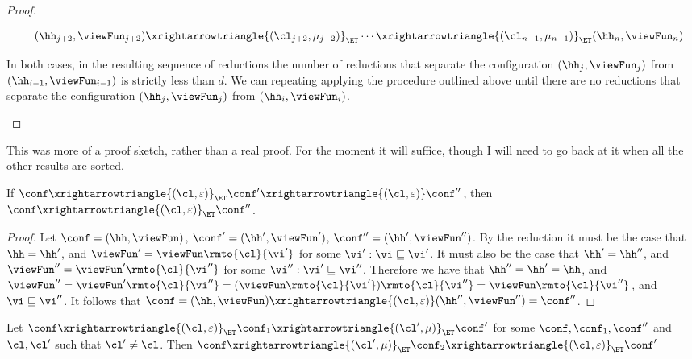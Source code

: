 \begin{proof}
\begin{enumerate}
\begin{itemize}
\[\begin{array}{@{}l@{}}
\quad (\hh_{j+2}, \viewFun_{j+2}) \xrightarrowtriangle{(\cl_{j+2}, \mu_{j+2})}_{\ET} \cdots 
\xrightarrowtriangle{(\cl_{n-1}, \mu_{n-1})}_{\ET} (\hh_{n}, \viewFun_{n})
\end{array}
\]
\end{itemize}
In both cases, in the resulting sequence of reductions the number of reductions that separate 
the configuration $(\hh_{j}, \viewFun_{j})$ from $(\hh_{i-1}, \viewFun_{i-1})$ is strictly 
less than $d$. We can repeating applying the procedure outlined above until there are 
no reductions that separate the configuration $(\hh_{j}, \viewFun_{j})$ from 
$(\hh_{i}, \viewFun_{i})$.
\end{enumerate}
\end{proof}
\ac{This was more of a proof sketch, rather than a real proof. For the moment it will suffice, though 
I will need to go back at it when all the other results are sorted.}


\begin{lemma}[Absorption]
\label{lem:et.absorb}
If $\conf \xrightarrowtriangle{(\cl, \varepsilon)}_{\ET} \conf' \xrightarrowtriangle{(\cl, \varepsilon)} \conf''$, then 
$\conf \xrightarrowtriangle{(\cl, \varepsilon)}_{\ET} \conf''$.
\end{lemma}

\begin{proof}
Let $\conf = (\hh, \viewFun)$, $\conf' = (\hh', \viewFun')$, $\conf'' = (\hh', \viewFun'')$. 
By the reduction it must be the case that $\hh = \hh'$, and $\viewFun' = \viewFun\rmto{\cl}{\vi'}$ 
for some $\vi' : \vi \sqsubseteq \vi'$. It must also be the case that $\hh' = \hh''$, and $\viewFun'' = \viewFun'\rmto{\cl}{\vi''}$ 
for some $\vi'': \vi' \sqsubseteq \vi''$. Therefore we have that $\hh'' = \hh' = \hh$, and 
$\viewFun'' = \viewFun'\rmto{\cl}{\vi''} = (\viewFun\rmto{\cl}{\vi'})\rmto{\cl}{\vi''} = \viewFun\rmto{\cl}{\vi''}$, 
and $\vi \sqsubseteq \vi''$. 
It follows that $\conf = (\hh, \viewFun) \xrightarrowtriangle{(\cl, \varepsilon)} (\hh'', \viewFun'') = \conf''$.
\end{proof}

\begin{lemma}
\label{lem:viewshift.rightmover}
Let $\conf \xrightarrowtriangle{(\cl, \varepsilon)}_{\ET} \conf_1 \xrightarrowtriangle{(\cl', \mu)}_{\ET} \conf'$ 
for some $\conf, \conf_1, \conf''$ and $\cl, \cl'$ such that $\cl' \neq \cl$. 
Then $\conf \xrightarrowtriangle{(\cl', \mu)}_{\ET} \conf_2 \xrightarrowtriangle{(\cl, \varepsilon)}_{\ET} \conf'$ 
\end{lemma}

